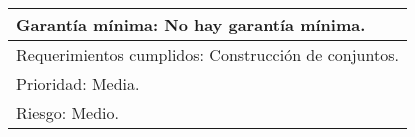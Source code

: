 \begin{longtable}{|l|l|}
\multicolumn{2}{|l|}{Garantía mínima: No hay garantía mínima.}                                                                                                                                                                                                                                                                                                                                                                          \\ \hline
\multicolumn{2}{|l|}{Requerimientos cumplidos: Construcción de conjuntos.}                                                                                                                                                                                                                                                                                                                                                              \\ \hline
\multicolumn{2}{|l|}{Prioridad: Media.}                                                                                                                                                                                                                                                                                                                                                                                                 \\ \hline
\multicolumn{2}{|l|}{Riesgo: Medio.}                                                                                                                                                                                                                                                                                                                                                                                                    \\ \hline
\end{longtable}